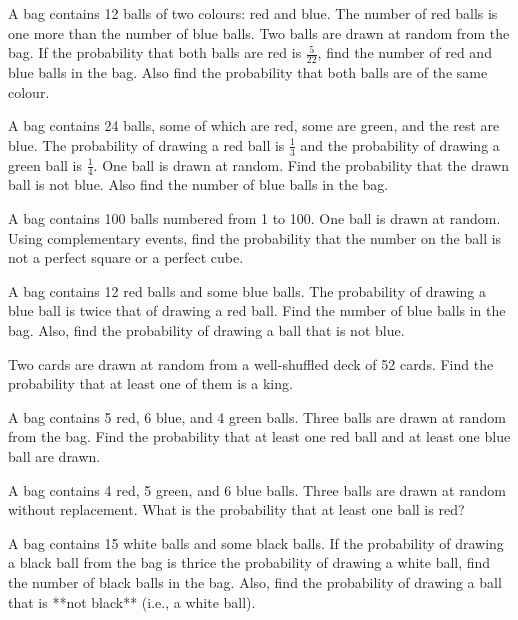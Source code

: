 \documentclass[12pt,a4paper]{exam}
\begin{document}
\begin{questions}
\question[5] A bag contains 12 balls of two colours: red and blue. The number of red balls is one more than the number of blue balls. Two balls are drawn at random from the bag. If the probability that both balls are red is $\frac{5}{22}$, find the number of red and blue balls in the bag. Also find the probability that both balls are of the same colour.
\vspace{0.15cm}

\question[5] A bag contains 24 balls, some of which are red, some are green, and the rest are blue. The probability of drawing a red ball is $\frac{1}{3}$ and the probability of drawing a green ball is $\frac{1}{4}$. One ball is drawn at random. Find the probability that the drawn ball is not blue. Also find the number of blue balls in the bag.
\vspace{0.15cm}

\question[5] A bag contains 100 balls numbered from 1 to 100. One ball is drawn at random. Using complementary events, find the probability that the number on the ball is not a perfect square or a perfect cube.
\vspace{0.15cm}

\question[5] A bag contains 12 red balls and some blue balls. The probability of drawing a blue ball is twice that of drawing a red ball. Find the number of blue balls in the bag. Also, find the probability of drawing a ball that is not blue.
\vspace{0.15cm}

\question[5] Two cards are drawn at random from a well-shuffled deck of 52 cards. Find the probability that at least one of them is a king.
\vspace{0.15cm}

\question[5] A bag contains 5 red, 6 blue, and 4 green balls. Three balls are drawn at random from the bag. Find the probability that at least one red ball and at least one blue ball are drawn.
\vspace{0.15cm}

\question[5] A bag contains 4 red, 5 green, and 6 blue balls. Three balls are drawn at random without replacement. What is the probability that at least one ball is red?
\vspace{0.15cm}

\question[5] A bag contains 15 white balls and some black balls. If the probability of drawing a black ball from the bag is thrice the probability of drawing a white ball, find the number of black balls in the bag. Also, find the probability of drawing a ball that is **not black** (i.e., a white ball).
\vspace{0.15cm}


\end{questions}
\end{document}
